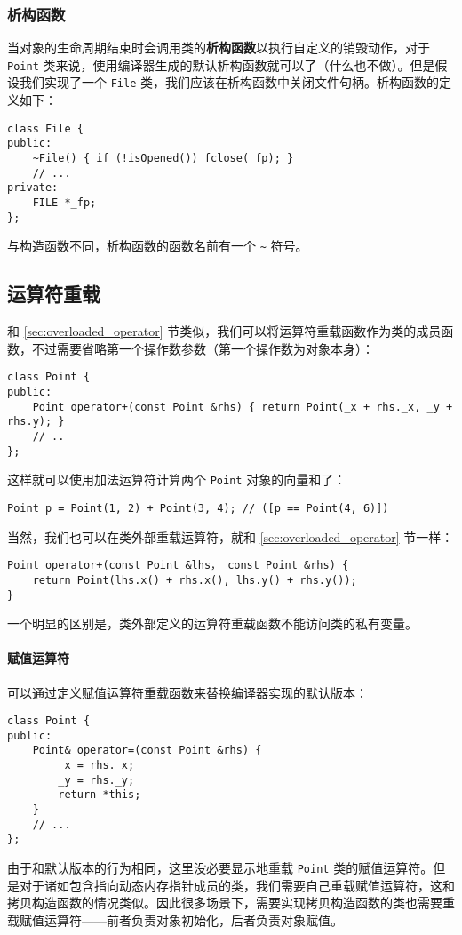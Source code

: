 \documentclass[hyperref,UTF8]{article}
\begin{document}
\subsubsection{析构函数}

当对象的生命周期结束时会调用类的\textbf{析构函数}以执行自定义的销毁动作，对于 \texttt{Point} 类来说，使用编译器生成的默认析构函数就可以了（什么也不做）。但是假设我们实现了一个 \texttt{File} 类，我们应该在析构函数中关闭文件句柄。析构函数的定义如下：
\begin{lstlisting}
class File {
public:
    ~File() { if (!isOpened()) fclose(_fp); }
    // ...
private:
    FILE *_fp;
};
\end{lstlisting}
与构造函数不同，析构函数的函数名前有一个 \texttt{\textasciitilde} 符号。

\subsection{运算符重载}

和 \ref{sec:overloaded_operator} 节类似，我们可以将运算符重载函数作为类的成员函数，不过需要省略第一个操作数参数（第一个操作数为对象本身）：
\begin{lstlisting}
class Point {
public:
    Point operator+(const Point &rhs) { return Point(_x + rhs._x, _y + rhs.y); }
    // ..
};
\end{lstlisting}
这样就可以使用加法运算符计算两个 \texttt{Point} 对象的向量和了：
\begin{lstlisting}[numbers=none]
Point p = Point(1, 2) + Point(3, 4); // ([p == Point(4, 6)])
\end{lstlisting}

当然，我们也可以在类外部重载运算符，就和 \ref{sec:overloaded_operator} 节一样：
\begin{lstlisting}
Point operator+(const Point &lhs， const Point &rhs) {
    return Point(lhs.x() + rhs.x(), lhs.y() + rhs.y());
}
\end{lstlisting}
一个明显的区别是，类外部定义的运算符重载函数不能访问类的私有变量。

\paragraph{赋值运算符}

可以通过定义赋值运算符重载函数来替换编译器实现的默认版本：
\begin{lstlisting}
class Point {
public:
    Point& operator=(const Point &rhs) {
        _x = rhs._x;
        _y = rhs._y;
        return *this;
    }
    // ...
};
\end{lstlisting}
由于和默认版本的行为相同，这里没必要显示地重载 \texttt{Point} 类的赋值运算符。但是对于诸如包含指向动态内存指针成员的类，我们需要自己重载赋值运算符，这和拷贝构造函数的情况类似。因此很多场景下，需要实现拷贝构造函数的类也需要重载赋值运算符——前者负责对象初始化，后者负责对象赋值。
\end{document}
